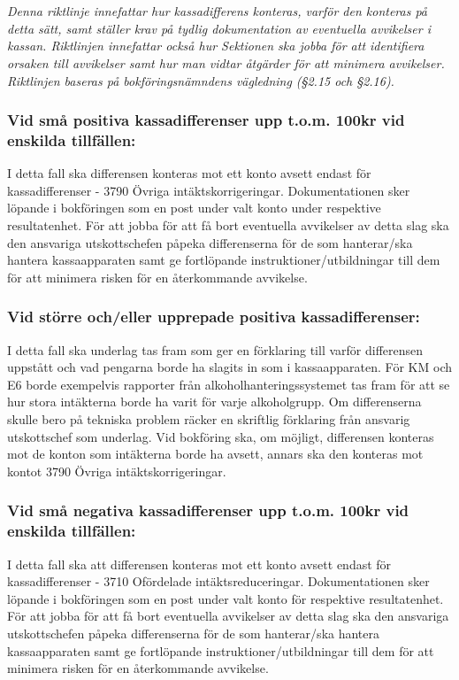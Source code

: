 \documentclass[10pt]{article}
\begin{document}
\section*{\doctitle}
\emph{Denna riktlinje innefattar hur kassadifferens konteras, varför den konteras på detta sätt, samt ställer krav på tydlig dokumentation av eventuella avvikelser i kassan. Riktlinjen innefattar också hur Sektionen ska jobba för att identifiera orsaken till avvikelser samt hur man vidtar åtgärder för att minimera avvikelser. Riktlinjen baseras på bokföringsnämndens vägledning (\S2.15 och \S2.16).}

\subsubsection*{Vid små positiva kassadifferenser upp t.o.m. 100kr vid enskilda tillfällen:}
I detta fall ska differensen konteras mot ett konto avsett endast för kassadifferenser - 3790 Övriga intäktskorrigeringar.
Dokumentationen sker löpande i bokföringen som en post under valt konto under respektive resultatenhet.
För att jobba för att få bort eventuella avvikelser av detta slag ska den ansvariga utskottschefen påpeka differenserna för de som hanterar/ska hantera kassaapparaten samt ge fortlöpande instruktioner/utbildningar till dem för att minimera risken för en återkommande avvikelse.

\subsubsection*{Vid större och/eller upprepade positiva kassadifferenser:}
I detta fall ska underlag tas fram som ger en förklaring till varför differensen uppstått och vad pengarna borde ha slagits in som i kassaapparaten.
För KM och E6 borde exempelvis rapporter från alkoholhanteringssystemet tas fram för att se hur stora intäkterna borde ha varit för varje alkoholgrupp.
Om differenserna skulle bero på tekniska problem räcker en skriftlig förklaring från ansvarig utskottschef som underlag.
Vid bokföring ska, om möjligt, differensen konteras mot de konton som intäkterna borde ha avsett, annars ska den konteras mot kontot 3790 Övriga intäktskorrigeringar.

\subsubsection*{Vid små negativa kassadifferenser upp t.o.m. 100kr vid enskilda tillfällen:}
I detta fall ska att differensen konteras mot ett konto avsett endast för kassadifferenser - 3710 Ofördelade intäktsreduceringar.
Dokumentationen sker löpande i bokföringen som en post under valt konto för respektive resultatenhet.
För att jobba för att få bort eventuella avvikelser av detta slag ska den ansvariga utskottschefen påpeka differenserna för de som hanterar/ska hantera kassaapparaten samt ge fortlöpande instruktioner/utbildningar till dem för att minimera risken för en återkommande avvikelse.
\end{document}
